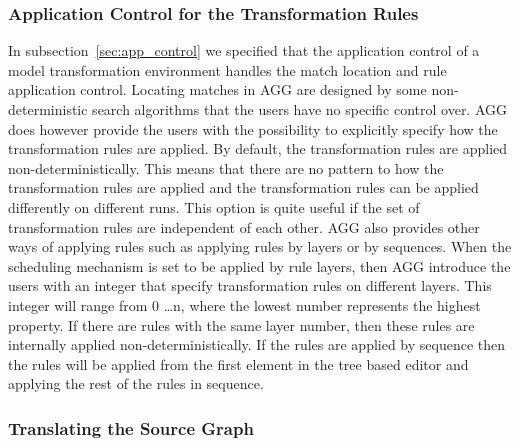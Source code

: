 \subsubsection*{Application Control for the Transformation Rules}

In subsection~\ref{sec:app_control} we specified that the application control of
a model transformation environment handles the match location and rule
application control. Locating matches in AGG are designed by some non-deterministic search
algorithms that the users have no specific control over. AGG does however
provide the users with the possibility to explicitly specify how the transformation rules
are applied. By default, the transformation rules are applied
non-deterministically. This means that there are no pattern to how the
transformation rules are applied and the transformation rules can be applied
differently on different runs. This option is quite useful if the set of
transformation rules are independent of each other. AGG also provides other
ways of applying rules such as applying rules by layers or by sequences. When
the scheduling mechanism is set to be applied by rule layers, then AGG introduce
the users with an integer that specify transformation rules on different layers.
This integer will range from 0 \ldots n, where the lowest number represents the
highest property.
If there are rules with the same layer number, then these rules are internally
applied non-deterministically. If the rules are applied by sequence then the rules will
be applied from the first element in the tree based editor and applying the rest
of the rules in sequence.

\subsubsection*{Translating the Source Graph}


